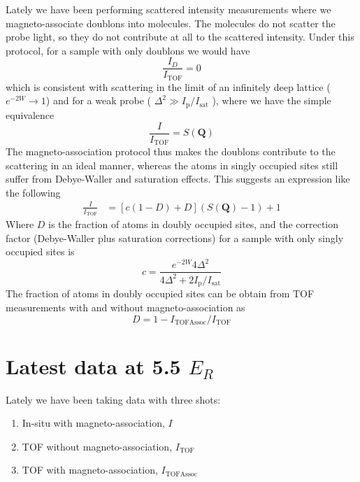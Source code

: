 \documentclass[11pt,letter]{article}
\newcommand{\bv}[1]{\ensuremath{\bm{#1}}}
\newcommand{\iisat}{\ensuremath{I_{\mathrm{p}}/I_{\mathrm{sat}}}}
\begin{document}
Lately we have been performing scattered intensity measurements where we
magneto-associate doublons into molecules.  The molecules do not scatter the
probe light, so they do not contribute at all to the scattered intensity.  Under this protocol, for a sample with only doublons we would have 
\begin{equation}
 \frac{I_{D}}{I_{\text{TOF}} } = 0  
\end{equation}
which is consistent with scattering in the limit of an infinitely deep lattice
($e^{-2W}\rightarrow 1$) and for a weak probe ( $\Delta^{2} \gg \iisat$ ),
where we have the simple equivalence 
\begin{equation}
  \frac{I}{ I_{\mathrm{TOF}}} = S(\bv{Q}) 
\end{equation}
The magneto-association protocol thus makes the doublons contribute to the
scattering in an ideal manner, whereas the atoms in singly occupied sites
still suffer from Debye-Waller and saturation effects.  This suggests an expression like the following
\begin{equation}
\begin{split} 
 \frac{I}{I_{\text{TOF}} } 
&  =
   \left[ c(1-D) + D \right]  
   \left( S(\bv{Q})
     - 1 \right)
  + 1
 \label{eq:assoc-correct}  
\end{split}
\end{equation}
Where $D$ is the fraction of atoms in doubly occupied sites, and the correction
factor (Debye-Waller plus saturation corrections) for a sample with only singly
occupied sites is 
\begin{equation}
   c =   \frac{ e^{-2W}4 \Delta^{2}  } 
           {4 \Delta^{2} + 2 \iisat }  
\end{equation}
The fraction of atoms in doubly occupied sites can be obtain from TOF measurements with and without magneto-association as 
\begin{equation}
  D  = 1 - I_{\text{TOFAssoc}}/ I_{\text{TOF}} 
\end{equation}


\section{ Latest data at 5.5 $E_{R}$} 

Lately we have been taking data with three shots:
\begin{enumerate}
  \item In-situ with magneto-association, $I$ 
  \item TOF without magneto-association, $I_{\text{TOF}}$ 
  \item TOF with magneto-association, $I_{\text{TOFAssoc}}$
\end{enumerate}
\end{document}
